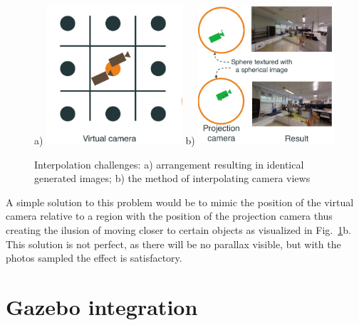 \documentclass{svproc}
\begin{document}
\begin{figure}[!ht]
    \centering
    a) \includegraphics[width=0.45\textwidth]{img/interpolation/virt.pdf}
    b) \includegraphics[width=0.45\textwidth]{img/interpolation/proj.pdf}
    \caption{Interpolation challenges: a) arrangement resulting in identical generated images; b) the method of interpolating camera views}
    \label{fig:interpolation}
\end{figure}

A simple solution to this problem would be to mimic the position of the virtual camera relative 
to a region with the position of the projection camera thus creating the ilusion of moving closer 
to certain objects as visualized in Fig.~\ref{fig:interpolation}b. This solution is not perfect,
as there will be no parallax visible, but with the photos sampled 
 the effect is 
satisfactory.


\section{Gazebo integration}
\label{sec:gazebo}
\end{document}
